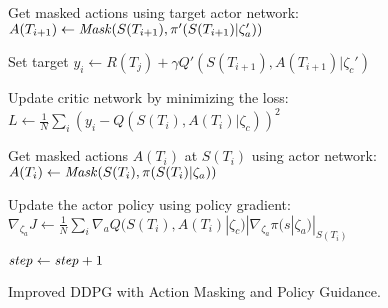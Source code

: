 \begin{algorithm}[t]
{{{           {\color{black} Get masked actions using target actor network:\\
            $A(T_{i+1})\leftarrow {\it Mask}(S(T_{i+1}), \pi'(S(T_{i+1}) | \zeta_a'))$}  

            Set target $y_i\leftarrow R(T_j) + \gamma Q'(S(T_{i+1}), A(T_{i+1})
            | \zeta_c')$ 
            
            Update critic network by minimizing the loss: $L 
            \leftarrow \frac{1}{N} \sum_i (y_i - Q(S(T_i), A(T_i) | \zeta_c))^2$ 
            
             {\color{black} Get masked actions $A(T_i)$ at $S(T_i)$ using actor network: $A(T_i)\leftarrow {\it Mask}( S(T_i), \pi(S(T_i) | \zeta_a))$ }%
           
            Update the actor policy using policy gradient:\\
            $\nabla_{\zeta_a} J \leftarrow \frac{1}{N} \sum_i \nabla_a Q(S(T_i), A(T_i) | \zeta_c) | \nabla_{\zeta_a} \pi(s | \zeta_a) |_{S(T_i)}$}
            
        ${\it step}\gets {\it step}+1$
        }
    }
    \caption{Improved DDPG with Action Masking and Policy Guidance.}
\label{alg:DDPG} 
\end{algorithm}